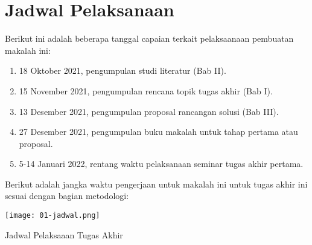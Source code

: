 \section{Jadwal Pelaksanaan}

Berikut ini adalah beberapa tanggal capaian terkait pelaksaanaan pembuatan makalah ini:

\begin{enumerate}
  \item 18 Oktober 2021, pengumpulan studi literatur (Bab II).
  \item 15 November 2021, pengumpulan rencana topik tugas akhir (Bab I).
  \item 13 Desember 2021, pengumpulan proposal rancangan solusi (Bab III).
  \item 27 Desember 2021, pengumpulan buku makalah untuk tahap pertama atau proposal.
  \item 5-14 Januari 2022, rentang waktu pelaksanaan seminar tugas akhir pertama.
\end{enumerate}

Berikut adalah jangka waktu pengerjaan untuk makalah ini untuk tugas akhir ini sesuai dengan bagian metodologi:

\begin{table}[ht]
  \centering
  \texttt{[image: 01-jadwal.png]}
  \caption{Jadwal Pelaksaaan Tugas Akhir}
\end{table}


    

